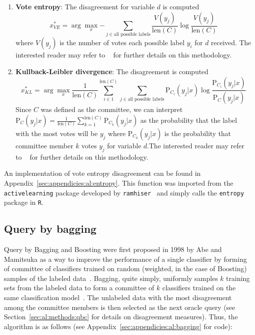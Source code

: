 \tablespacing
\begin{enumerate}
	\item \textbf{Vote entropy}: The disagreement for variable $d$ is computed  
	$$x^*_{VE}=\arg\max_x{-\sum\limits_{j \in \text{all possible labels}} 
	\frac{V(y_j)}{\text{len}(C)} \log \frac{V(y_j)}{\text{len}(C)}}$$
	\noindent where $V(y_j)$ is the number of votes each possible label $y_i$ 
	for $d$ received. The interested reader may refer to ~\cite{dagan1995} 
	for further details on this methodology.
	\item \textbf{Kullback-Leibler divergence}: The disagreement is computed
	$$x^*_{KL}=\arg\max_x{\frac{1}{\text{len}(C)} \sum\limits_{i \in 
	1}^{\text{len}(C)} \sum\limits_{j \in \text{all possible labels}} 
	\text{P}_{C_i}(y_j|x) \log \frac{\text{P}_{C_i}(y_j|x)}
	{\text{P}_{C}(y_j|x)}}$$
	\noindent Since	$C$ was defined as the committee, we can interpret 
	$\text{P}_{C}(y_j|x) = \frac{1}{\text{len}(C)} 
	\sum\limits_{k=1}^{\text{len}(C)} \text{P}_{C_k}(y_j|x)$ as the probability 
	that the label with the most votes will be $y_j$ where 
	$\text{P}_{C_k}(y_j|x)$ is the probability that committee member $k$ votes 
	$y_j$ for variable $d$.The interested reader may refer to 
	~\cite{mccallum1998} for further details on this methodology.
\end{enumerate}
\bodyspacing

\noindent An implementation of vote entropy disagreement can be found in 
Appendix~\ref{sec:appendicies:al:entropy}. This function was imported from the 
\texttt{activelearning} package developed by 
\texttt{ramhiser}~\cite{ramhiser2015} and simply calls the \texttt{entropy} 
package in \texttt{R}.









\subsection{Query by bagging}
\label{sec:al:methods:bagging}

Query by Bagging and Boosting were first proposed in 1998 by Abe and Mamitsuka 
as a way to improve the performance of a single classifier by forming of 
committee of classifiers trained on random (weighted, in the case of Boosting) 
samples of the labeled data~\cite{abe1998}. 
Bagging, quite simply, uniformly samples $k$ training sets from the labeled 
data to form a committee of $k$ classifiers trained on the same classification 
model~\cite{abe1998}. The unlabeled data with the most disagreement among the 
committee members is then selected as the next oracle query (see 
Section~\ref{sec:al:methods:qbc} for details on disagreement measures).
Thus, the algorithm is as follows (see 
Appendix~\ref{sec:appendicies:al:bagging} for code):

